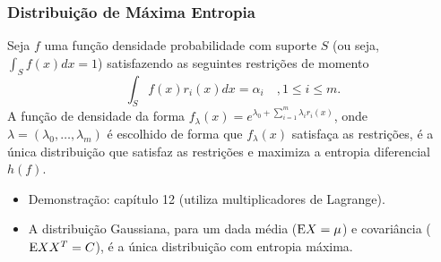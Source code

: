 

\begin{frame}[allowframebreaks]
  \frametitle{Distribuição de Máxima Entropia}

  \begin{theorem}
  Seja $f$ uma função densidade probabilidade com suporte $S$ (ou seja,
  $\int_S f(x) dx = 1$) satisfazendo as seguintes restrições de momento
	\begin{equation}
	\int_S f(x) r_i(x) dx = \alpha_i \quad , 1 \leq i \leq m .
	\end{equation}
  A função de densidade da forma $f_{\lambda}(x) = e^{\lambda_0 + \sum_{i=1}^{m} \lambda_i r_i (x)}$,
  onde $\lambda = (\lambda_0, \ldots, \lambda_m)$ é escolhido de forma que $f_{\lambda}(x)$ satisfaça 
  as restrições, é a única distribuição que satisfaz as restrições e maximiza a 
  entropia diferencial $h(f)$.
  \end{theorem}

  \begin{itemize}
  \item Demonstração: capítulo 12 (utiliza multiplicadores de Lagrange).
  \item A distribuição Gaussiana, para um dada média ($\mathrm{E} X = \mu$) e covariância ($\mathrm{E} X X^T = C$), 
	é a única distribuição com entropia máxima.
  \end{itemize}

  \framebreak


\end{frame}
